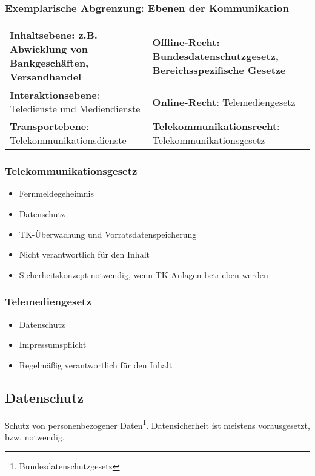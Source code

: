 \subsubsection{Exemplarische Abgrenzung: Ebenen der Kommunikation}

\begin{tabularx}{\columnwidth}{|X|X|l}
	\hline
	\textbf{Inhaltsebene}: z.B. Abwicklung von Bankgeschäften, Versandhandel & \textbf{Offline-Recht}: Bundesdatenschutzgesetz, Bereichsspezifische Gesetze \\
	\hline
	\textbf{Interaktionsebene}: Teledienste und Mediendienste & \textbf{Online-Recht}: Telemediengesetz \\
	\hline
	\textbf{Transportebene}: Telekommunikationsdienste & \textbf{Telekommunikationsrecht}: Telekommunikationsgesetz \\
	\hline
\end{tabularx}

\subsubsection{Telekommunikationsgesetz}
\begin{itemize}
	\item Fernmeldegeheimnis
	\item Datenschutz
	\item TK-Überwachung und Vorratsdatenspeicherung
	\item Nicht verantwortlich für den Inhalt
	\item Sicherheitskonzept notwendig, wenn TK-Anlagen betrieben werden
\end{itemize}

\subsubsection{Telemediengesetz}
\begin{itemize}
	\item Datenschutz
	\item Impressumspflicht
	\item Regelmäßig verantwortlich für den Inhalt
\end{itemize}


\subsection{Datenschutz}
Schutz von personenbezogener Daten\footnote{Bundesdatenschutzgesetz}. Datensicherheit ist meistens vorausgesetzt, bzw. notwendig.

